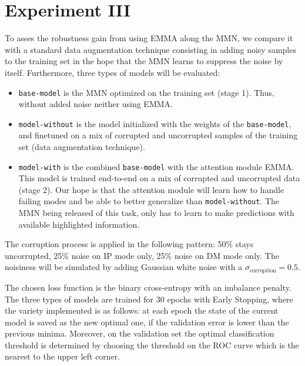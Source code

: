 \newpage\section{Experiment III}\label{sec:expIII}
To asses the robustness gain from using EMMA along the MMN, we compare it with a standard data augmentation technique consisting in adding noisy samples to the training set in the hope that the MMN learns to suppress the noise by itself. Furthermore, three types of models will be evaluated:
\begin{itemize}
\item \texttt{base-model} is the MMN optimized on the training set (stage 1). Thus, without added noise neither using EMMA.
\item \texttt{model-without} is the model initialized with the weights of the \texttt{base-model}, and finetuned on a mix of corrupted and uncorrupted samples of the training set (data augmentation technique).
\item \texttt{model-with} is the combined \texttt{base-model} with the attention module EMMA. This model is trained end-to-end on a mix of corrupted and uncorrupted data (stage 2). Our hope is that the attention module will learn how to handle failing modes and be able to better generalize than  \texttt{model-without}. The MMN being released of this task, only has to learn to make predictions with available highlighted information.
\end{itemize}
The corruption process is applied in the following pattern: 50\% stays uncorrupted, 25\% noise on IP mode only, 25\% noise on DM mode only. The noisiness will be simulated by adding Gaussian white noise with a $\sigma_{\text{corruption}} = 0.5$.

The chosen loss function is the binary cross-entropy with an imbalance penalty. The three types of models are trained for 30 epochs with Early Stopping, where the variety implemented is as follows: at each epoch the state of the current model is saved as the new optimal one, if the validation  error is lower than the previous minima. Moreover, on the validation set the optimal classification threshold is determined by choosing the threshold on the ROC curve which is the nearest to the upper left corner.


